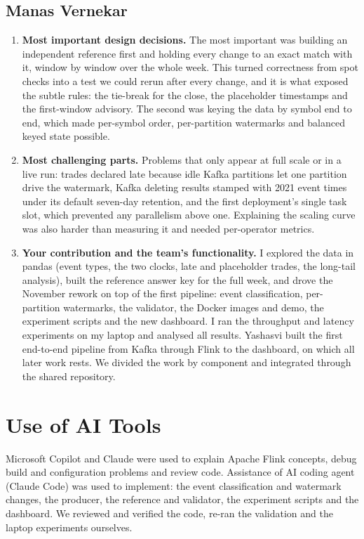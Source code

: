\documentclass[sigconf]{acmart}
\begin{document}
\subsection{\texorpdfstring{{Manas Vernekar}}{Manas Vernekar}}
\begin{enumerate}
  \item \textbf{Most important design decisions.} The most important was building an independent reference first and holding every change to an exact match with it, window by window over the whole week. This turned correctness from spot checks into a test we could rerun after every change, and it is what exposed the subtle rules: the tie-break for the close, the placeholder timestamps and the first-window advisory. The second was keying the data by symbol end to end, which made per-symbol order, per-partition watermarks and balanced keyed state possible.
  \item \textbf{Most challenging parts.} Problems that only appear at full scale or in a live run: trades declared late because idle Kafka partitions let one partition drive the watermark, Kafka deleting results stamped with 2021 event times under its default seven-day retention, and the first deployment's single task slot, which prevented any parallelism above one. Explaining the scaling curve was also harder than measuring it and needed per-operator metrics.
  \item \textbf{Your contribution and the team's functionality.} I explored the data in pandas (event types, the two clocks, late and placeholder trades, the long-tail analysis), built the reference answer key for the full week, and drove the November rework on top of the first pipeline: event classification, per-partition watermarks, the validator, the Docker images and demo, the experiment scripts and the new dashboard. I ran the throughput and latency experiments on my laptop and analysed all results. Yashasvi built the first end-to-end pipeline from Kafka through Flink to the dashboard, on which all later work rests. We divided the work by component and integrated through the shared repository.
\end{enumerate}

\section*{Use of AI Tools}
Microsoft Copilot and Claude were used to explain Apache Flink concepts, debug build and configuration problems and review code. Assistance of AI coding agent (Claude Code) was used to implement: the event classification and watermark changes, the producer, the reference and validator, the experiment scripts and the dashboard. We reviewed and verified the code, re-ran the validation and the laptop experiments ourselves.



\end{document}
